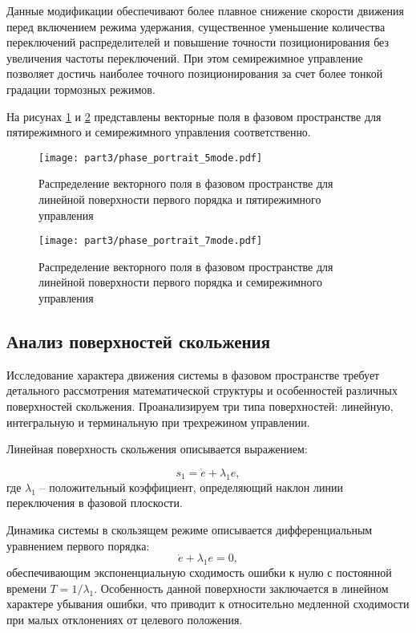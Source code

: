 Данные модификации обеспечивают более плавное снижение скорости движения перед включением режима удержания,
существенное уменьшение количества переключений распределителей и повышение точности позиционирования
без увеличения частоты переключений. При этом семирежимное управление позволяет достичь
наиболее точного позиционирования за счет более тонкой градации тормозных режимов.

На рисунах \ref{fig:vector_field_linear_5mode} и \ref{fig:vector_field_linear_7mode} представлены векторные поля
в фазовом пространстве для пятирежимного и семирежимного управления соответственно.

\begin{figure}[htbp]
	\centering
	\texttt{[image: part3/phase\_portrait\_5mode.pdf]}
	\caption{Распределение векторного поля в фазовом пространстве для линейной поверхности первого порядка и пятирежимного управления}
	\label{fig:vector_field_linear_5mode}
\end{figure}

\begin{figure}[htbp]
	\centering
	\texttt{[image: part3/phase\_portrait\_7mode.pdf]}
	\caption{Распределение векторного поля в фазовом пространстве для линейной поверхности первого порядка и семирежимного управления}
	\label{fig:vector_field_linear_7mode}
\end{figure}

\subsection{Анализ поверхностей скольжения}\label{subsec:ch3/sec3/sub3}

Исследование характера движения системы в фазовом пространстве требует детального рассмотрения математической
структуры и особенностей различных поверхностей скольжения.
Проанализируем три типа поверхностей: линейную, интегральную и терминальную при трехрежином управлении.

Линейная поверхность скольжения описывается выражением:

\begin{equation}
	s_1 = \dot{e} + \lambda_1 e,
\end{equation}
где $\lambda_1$ -- положительный коэффициент, определяющий наклон линии переключения в
фазовой плоскости.

Динамика системы в скользящем режиме описывается дифференциальным уравнением первого порядка:
\begin{equation}
	\dot{e} + \lambda_1 e = 0,
\end{equation}
обеспечивающим экспоненциальную сходимость ошибки к нулю с постоянной
времени $T = 1/\lambda_1$. Особенность данной поверхности заключается в
линейном характере убывания ошибки, что приводит к
относительно медленной сходимости при малых отклонениях от целевого положения.

